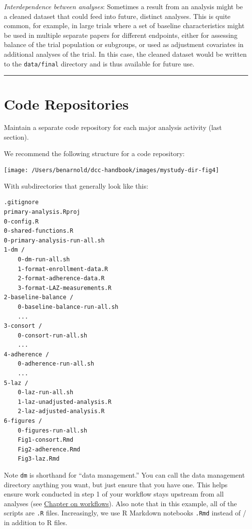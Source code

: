 \documentclass[]{book}
\begin{document}
\emph{Interdependence between analyses}: Sometimes a result from an analysis might be a cleaned dataset that could feed into future, distinct analyses. This is quite common, for example, in large trials where a set of baseline characteristics might be used in multiple separate papers for different endpoints, either for assessing balance of the trial population or subgroups, or used as adjustment covariates in additional analyses of the trial. In this case, the cleaned dataset would be written to the \texttt{data/final} directory and is thus available for future use.

\begin{center}\rule{0.5\linewidth}{\linethickness}\end{center}

\hypertarget{code-repositories}{%
\section{Code Repositories}\label{code-repositories}}

Maintain a separate code repository for each major analysis activity (last section).

We recommend the following structure for a code repository:

\texttt{[image: /Users/benarnold/dcc-handbook/images/mystudy-dir-fig4]}

With subdirectories that generally look like this:

\begin{verbatim}
.gitignore
primary-analysis.Rproj
0-config.R
0-shared-functions.R
0-primary-analysis-run-all.sh
1-dm /
    0-dm-run-all.sh
    1-format-enrollment-data.R
    2-format-adherence-data.R
    3-format-LAZ-measurements.R
2-baseline-balance /
    0-baseline-balance-run-all.sh
    ...
3-consort /
    0-consort-run-all.sh
    ...
4-adherence /
    0-adherence-run-all.sh
    ...
5-laz /
    0-laz-run-all.sh
    1-laz-unadjusted-analysis.R
    2-laz-adjusted-analysis.R
6-figures / 
    0-figures-run-all.sh
    Fig1-consort.Rmd
    Fig2-adherence.Rmd
    Fig3-laz.Rmd
\end{verbatim}

Note \texttt{dm} is shorthand for ``data management.'' You can call the data management directory anything you want, but just ensure that you have one. This helps ensure work conducted in step 1 of your workflow stays upstream from all analyses (see \protect\hyperlink{workflows}{Chapter on workflows}). Also note that in this example, all of the scripts are \texttt{.R} files. Increasingly, we use R Markdown notebooks \texttt{.Rmd} instead of / in addition to R files.
\end{document}
